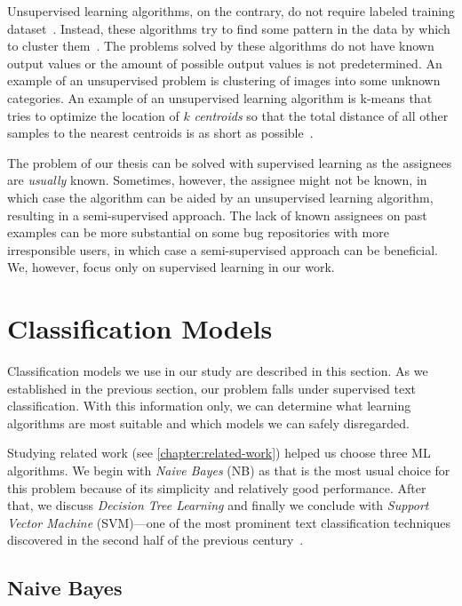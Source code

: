Unsupervised learning algorithms, on the contrary, do not require labeled training dataset~\cite{donalek2014supervised}. Instead, these algorithms try to find some pattern in the data by which to cluster them~\cite{donalek2014supervised}. The problems solved by these algorithms do not have known output values or the amount of possible output values is not predetermined. An example of an unsupervised problem is clustering of images into some unknown categories. An example of an unsupervised learning algorithm is k-means that tries to optimize the location of $k$ \textit{centroids} so that the total distance of all other samples to the nearest centroids is as short as possible~\cite{mitchell1997machine}.

The problem of our thesis can be solved with supervised learning as the assignees are \textit{usually} known. Sometimes, however, the assignee might not be known, in which case the algorithm can be aided by an unsupervised learning algorithm, resulting in a semi-supervised approach. The lack of known assignees on past examples can be more substantial on some bug repositories with more irresponsible users, in which case a semi-supervised approach can be beneficial. We, however, focus only on supervised learning in our work.

\section{Classification Models}

Classification models we use in our study are described in this section. As we established in the previous section, our problem falls under supervised text classification. With this information only, we can determine what learning algorithms are most suitable and which models we can safely disregarded.

Studying related work (see \autoref{chapter:related-work}) helped us choose three ML algorithms. We begin with \textit{Naive Bayes} (NB) as that is the most usual choice for this problem because of its simplicity and relatively good performance. After that, we discuss \textit{Decision Tree Learning} and finally we conclude with \textit{Support Vector Machine} (SVM)---one of the most prominent text classification techniques discovered in the second half of the previous century~\cite{vapnik1995svm}.

\subsection{Naive Bayes}


